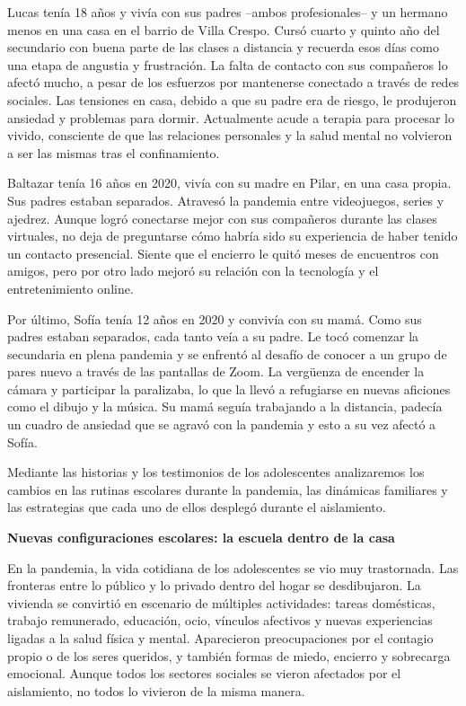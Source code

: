 Lucas tenía 18 años y vivía con sus padres --ambos profesionales-- y un hermano menos en una casa en el barrio de Villa Crespo. Cursó cuarto y quinto año del secundario con buena parte de las clases a distancia y recuerda esos días como una etapa de angustia y frustración. La falta de contacto con sus compañeros lo afectó mucho, a pesar de los esfuerzos por mantenerse conectado a través de redes sociales. Las tensiones en casa, debido a que su padre era de riesgo, le produjeron ansiedad y problemas para dormir. Actualmente acude a terapia para procesar lo vivido, consciente de que las relaciones personales y la salud mental no volvieron a ser las mismas tras el confinamiento.

Baltazar tenía 16 años en 2020, vivía con su madre en Pilar, en una casa propia. Sus padres estaban separados. Atravesó la pandemia entre videojuegos, series y ajedrez. Aunque logró conectarse mejor con sus compañeros durante las clases virtuales, no deja de preguntarse cómo habría sido su experiencia de haber tenido un contacto presencial. Siente que el encierro le quitó meses de encuentros con amigos, pero por otro lado mejoró su relación con la tecnología y el entretenimiento online.

Por último, Sofía tenía 12 años en 2020 y convivía con su mamá. Como sus padres estaban separados, cada tanto veía a su padre. Le tocó comenzar la secundaria en plena pandemia y se enfrentó al desafío de conocer a un grupo de pares nuevo a través de las pantallas de Zoom. La vergüenza de encender la cámara y participar la paralizaba, lo que la llevó a refugiarse en nuevas aficiones como el dibujo y la música. Su mamá seguía trabajando a la distancia, padecía un cuadro de ansiedad que se agravó con la pandemia y esto a su vez afectó a Sofía.

Mediante las historias y los testimonios de los adolescentes analizaremos los cambios en las rutinas escolares durante la pandemia, las dinámicas familiares y las estrategias que cada uno de ellos desplegó durante el aislamiento.

\textbf{Nuevas configuraciones escolares: la escuela dentro de la casa}

En la pandemia, la vida cotidiana de los adolescentes se vio muy trastornada. Las fronteras entre lo público y lo privado dentro del hogar se desdibujaron. La vivienda se convirtió en escenario de múltiples actividades: tareas domésticas, trabajo remunerado, educación, ocio, vínculos afectivos y nuevas experiencias ligadas a la salud física y mental. Aparecieron preocupaciones por el contagio propio o de los seres queridos, y también formas de miedo, encierro y sobrecarga emocional. Aunque todos los sectores sociales se vieron afectados por el aislamiento, no todos lo vivieron de la misma manera.


